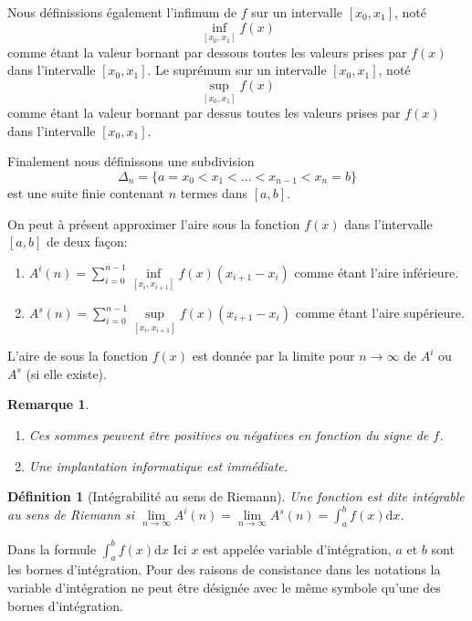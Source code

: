 \documentclass[a4paper,12pt]{book}
\newcommand{\dd}{\mathrm{d}}
\newtheorem{definition}{Définition}
\newtheorem*{remarque}{Remarque}
\begin{document}
Nous définissions également l'infimum de $f$ sur un intervalle $[x_0,x_1]$, noté 
\begin{equation*}
\inf\limits_{[x_0,x_1]} f(x)
\end{equation*}
comme étant la valeur bornant par dessous toutes les valeurs prises par $f(x)$ dans l'intervalle $[x_0,x_1]$. Le suprémum sur un intervalle $[x_0,x_1]$, noté 
\begin{equation*}
\sup\limits_{[x_0,x_1]} f(x)
\end{equation*}
comme étant la valeur bornant par dessus toutes les valeurs prises par $f(x)$ dans l'intervalle $[x_0,x_1]$.

Finalement nous définissons une subdivision 
\begin{equation*}
\Delta_n=\{a=x_0<x_1<...<x_{n-1}<x_{n}=b\}
\end{equation*}
est une suite finie contenant $n$ termes dans $[a,b]$. 

On peut à présent approximer l'aire sous la fonction $f(x)$ dans l'intervalle $[a,b]$ 
de deux façon:
\begin{enumerate}
\item $A^i(n)=\sum_{i=0}^{n-1} \inf\limits_{[x_i,x_{i+1}]} f(x) (x_{i+1}-x_i)$ comme étant l'aire inférieure.
\item $A^s(n)=\sum_{i=0}^{n-1} \sup\limits_{[x_i,x_{i+1}]} f(x) (x_{i+1}-x_i)$ comme étant l'aire supérieure.
\end{enumerate}
L'aire de sous la fonction $f(x)$ est donnée par la limite pour $n\rightarrow\infty$ 
de $A^i$ ou $A^s$ (si elle existe).
\begin{remarque}\hfill\break
\begin{enumerate}
\item Ces sommes peuvent être positives ou négatives en fonction du signe de $f$.
\item Une implantation informatique est immédiate.
\end{enumerate}
\end{remarque}

\begin{definition}[Intégrabilité au sens de Riemann]
Une fonction est dite intégrable au sens de Riemann si 
$\lim\limits_{n\rightarrow\infty}A^i(n)=\lim\limits_{n\rightarrow\infty}A^s(n)=\int_a^b f(x)\dd x$.
\end{definition}
Dans la formule $\int_a^b f(x)\dd x$ Ici $x$ est appelée variable d'intégration, 
$a$ et $b$ sont les bornes d'intégration. Pour des raisons de consistance dans les notations la variable d'intégration ne peut être désignée avec le même symbole qu'une des bornes d'intégration. 
\end{document}
